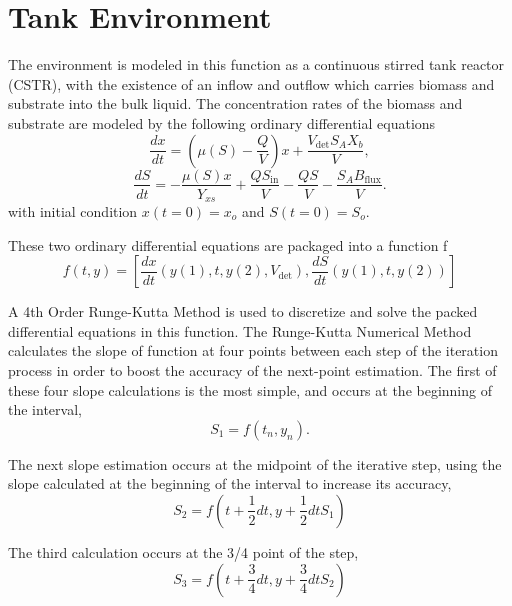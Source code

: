 \documentclass[letterpaper, twoside]{article}
\numberwithin{equation}{section}
\begin{document}
\section{Tank Environment}
The environment is modeled in this function as a continuous stirred tank reactor (CSTR), with the existence of an inflow and outflow which carries biomass and substrate into the bulk liquid. The concentration rates of the biomass and substrate are modeled by the following ordinary differential equations
\begin{equation} \label{eq: BiomassEquation}
  \frac{dx}{dt} = \left(\mu(S) - \frac{Q}{V}\right) x +\frac{ V_{\mathrm{det}} S_A X_b}{V},
\end{equation}
\begin{equation} \label{eq: SubstrateEquation}
  \frac{dS}{dt} = -\frac{\mu(S) x}{Y_{xs}} + \frac{Q S_{\mathrm{in}}}{V} - \frac{Q S}{V} - \frac{S_A B_{\mathrm{flux}}}{V}.
\end{equation}
with initial condition $x(t=0)=x_o$ and $S(t=0)=S_o$.

These two ordinary differential equations are packaged into a function f
\begin{equation} \label{eq: ODEpackagef}
  f(t,y) = \left[\frac{dx}{dt}\left(y(1), t, y(2), V_\mathrm{det}\right) , 
	      \frac{dS}{dt}\left(y(1), t, y(2)\right)\right]
\end{equation}

A 4th Order Runge-Kutta Method is used to discretize and solve the packed differential equations in this function. The Runge-Kutta Numerical Method calculates the slope of function at four points between each step of the iteration process in order to boost the accuracy of the next-point estimation. The first of these four slope calculations is the most simple, and occurs at the beginning of the interval,
\begin{equation} \label{eq: S_1}
  S_1 = f(t_n,y_n).
\end{equation}

The next slope estimation occurs at the midpoint of the iterative step, using the slope calculated at the beginning of the interval to increase its accuracy,
\begin{equation} \label{eq: S_2}
  S_2 = f(t + \frac{1}{2} dt,y + \frac{1}{2} dt S_1)
\end{equation}

The third calculation occurs at the 3/4  point of the step,
\begin{equation} \label{eq: S_3}
  S_3 = f(t + \frac{3}{4} dt,y+\frac{3}{4} dt S_2)
\end{equation}
\end{document}
